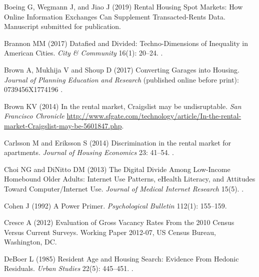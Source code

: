 \documentclass[11pt,letterpaper]{article}
\begin{document}
\begin{thebibliography}{77}
	Boeing G, Wegmann J, and Jiao J (2019) {Rental} {Housing} {Spot} {Markets}:
	{How} {Online} {Information} {Exchanges} {Can} {Supplement} {Transacted}-{Rents} {Data}.
	\newblock Manuscript submitted for publication.
	
	Brannon MM (2017) Datafied and {Divided}: {Techno}-{Dimensions} of {Inequality}
	in {American} {Cities}.
	\newblock \emph{City \& Community} 16(1): 20--24.
	\newblock {}.
	
	Brown A, Mukhija V and Shoup D (2017) Converting {Garages} into {Housing}.
	\newblock \emph{Journal of Planning Education and Research} (published online before print):
	0739456X1774196 .
	
	Brown KV (2014) In the rental market, {Craigslist} may be undisruptable.
	\newblock \emph{San Francisco Chronicle}
	\urlprefix\url{http://www.sfgate.com/technology/article/In-the-rental-market-Craigslist-may-be-5601847.php}.
	
	Carlsson M and Eriksson S (2014) Discrimination in the rental market for
	apartments.
	\newblock \emph{Journal of Housing Economics} 23: 41--54.
	\newblock {}.
	
	Choi NG and DiNitto DM (2013) The {Digital} {Divide} {Among} {Low}-{Income}
	{Homebound} {Older} {Adults}: {Internet} {Use} {Patterns}, {eHealth}
	{Literacy}, and {Attitudes} {Toward} {Computer}/{Internet} {Use}.
	\newblock \emph{Journal of Medical Internet Research} 15(5).
	\newblock {}.
	
	Cohen J (1992) A {Power} {Primer}.
	\newblock \emph{Psychological Bulletin} 112(1): 155--159.
	
	Cresce A (2012) Evaluation of {Gross} {Vacancy} {Rates} {From} the 2010
	{Census} {Versus} {Current} {Surveys}.
	\newblock Working {Paper} 2012-07, US Census Bureau, Washington, DC.
	
	DeBoer L (1985) Resident {Age} and {Housing} {Search}: {Evidence} {From}
	{Hedonic} {Residuals}.
	\newblock \emph{Urban Studies} 22(5): 445--451.
	\newblock {}.
	

\end{thebibliography}
\end{document}
